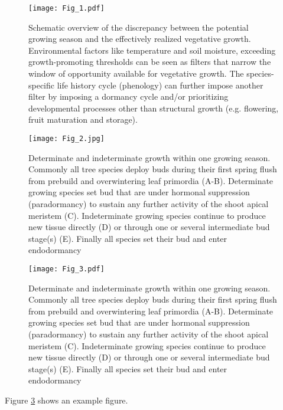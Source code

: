 \documentclass{article}
\begin{document}
	
	\begin{figure}
		\centering
		\texttt{[image: Fig\_1.pdf]} 
		\caption{Schematic overview of the discrepancy between the potential growing season and the effectively realized vegetative growth. Environmental factors like temperature and soil moisture, exceeding growth-promoting thresholds can be seen as filters that narrow the window of opportunity available for vegetative growth. The species-specific life history cycle (phenology) can further impose another filter by imposing a dormancy cycle and/or prioritizing developmental processes other than structural growth (e.g. flowering, fruit maturation and storage). }
		\label{fig:your-figure-label-xxx}
	\end{figure}
	
		\pagebreak
		
	\begin{figure}
		\centering
		\texttt{[image: Fig\_2.jpg]} 
		\caption{Determinate and indeterminate growth within one growing season. Commonly all tree species deploy buds during their first spring flush from prebuild and overwintering leaf primordia (A-B). Determinate growing species set bud that are under hormonal suppression (paradormancy) to sustain any further activity of the shoot apical meristem (C). Indeterminate growing species continue to produce new tissue directly (D) or through one or several intermediate bud stage(s) (E). Finally all species set their bud and enter endodormancy}
		\label{fig:your-figure-label-xxx}
	\end{figure}
	
		\begin{figure}
		\centering
		\texttt{[image: Fig\_3.pdf]} 
		\caption{Determinate and indeterminate growth within one growing season. Commonly all tree species deploy buds during their first spring flush from prebuild and overwintering leaf primordia (A-B). Determinate growing species set bud that are under hormonal suppression (paradormancy) to sustain any further activity of the shoot apical meristem (C). Indeterminate growing species continue to produce new tissue directly (D) or through one or several intermediate bud stage(s) (E). Finally all species set their bud and enter endodormancy}
		\label{fig:your-figure-label-xxx}
	\end{figure}
	
	Figure \ref{fig:your-figure-label-xxx} shows an example figure.
	
		\newpage
	
	
	
	
	
	
\end{document}
